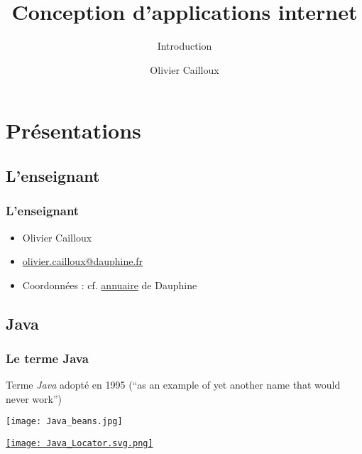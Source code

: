 \documentclass[english, french]{beamer}
\title{Conception d’applications internet}
\subtitle{Introduction}
\author{Olivier Cailloux}
\institute[LAMSADE]{LAMSADE, Université Paris-Dauphine}
\date{\formatdate{12}{11}{2015}}
\begin{document}


\begin{frame}[plain]
   \titlepage
\end{frame}
\addtocounter{framenumber}{-1}

\section{Présentations}
\subsection{L’enseignant}
\begin{frame}
	\frametitle{L’enseignant}
	\begin{itemize}
		\item Olivier Cailloux
		\item \href{mailto:olivier.cailloux@dauphine.fr}{olivier.cailloux@dauphine.fr}
		\item Coordonnées : cf. \href{https://www.ent.dauphine.fr/Annuaire/index.php?param0=fiche&param1=ocailloux}{annuaire} de Dauphine
	\end{itemize}
\end{frame}

\subsection{Java}
\begin{frame}[fragile]
	\frametitle{Le terme Java}
	
	Terme \emph{Java} adopté en 1995 (“as an example of yet another name that would never work”) 
	\hfill
	\vfill
	\begin{minipage}[b]{3cm}
		\texttt{[image: Java\_beans.jpg]}
	\end{minipage}%
	\begin{minipage}[b]{(\columnwidth - 3cm)}
		\pause
		\href{https://en.wikipedia.org/wiki/Java}{\texttt{[image: Java\_Locator.svg.png]}}
	\end{minipage}
\end{frame}
\end{document}
